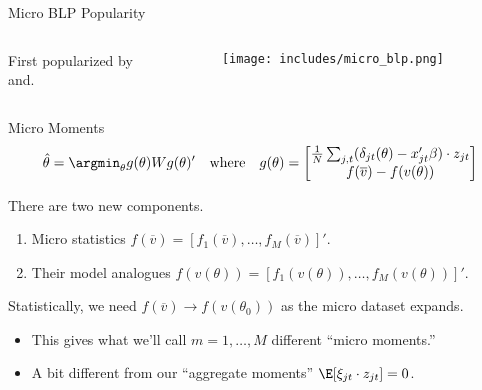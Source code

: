 \documentclass[aspectratio=169,t,11pt,table]{beamer}
\begin{document}
\begin{frame}{Micro BLP Popularity}
    \begin{columns}
        \begin{column}{0.37\textwidth}
            \vspace{-16em}
            \begin{wideitemize}
                \item First popularized by \\ \cite{petrin2002quantifying} and.
            \end{wideitemize}
        \end{column}
         \begin{column}{0.63\textwidth}
            \texttt{[image: includes/micro\_blp.png]}
        \end{column}
    \end{columns}
\end{frame}

\begin{frame}{Micro Moments}
    \begin{equation*}
        \hat{\theta} = \argmin_\theta g(\theta) W g(\theta)' \quad\text{where}\quad g(\theta) =
        \begin{bmatrix}
            \frac{1}{N} \sum_{j,t} (\delta_{jt}(\theta) - x_{jt}'\beta) \cdot z_{jt} \\
            f(\overline{v}) - f(v(\theta))
        \end{bmatrix}
    \end{equation*}
    \begin{wideitemize}
        \item There are two new components.
        \begin{enumerate}
            \item Micro statistics $f(\overline{v}) = [f_1(\overline{v}), \dots, f_M(\overline{v})]'$.
            \item Their model analogues $f(v(\theta)) = [f_1(v(\theta)), \dots, f_M(v(\theta))]'$.
        \end{enumerate}
        \pause
        \item Statistically, we need $f(\overline{v}) \to f(v(\theta_0))$ as the micro dataset expands.
        \begin{itemize}
            \item This gives what we'll call $m = 1, \dots, M$ different ``\alert{micro moments}.''
            \item A bit different from our ``aggregate moments'' $\E[\xi_{jt} \cdot z_{jt}] = 0$.
        \end{itemize}
    \end{wideitemize}
\end{frame}
\end{document}
